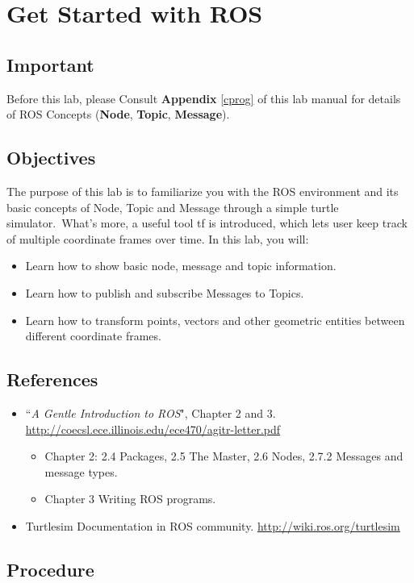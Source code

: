\chapter{Get Started with ROS}
\section{Important}
Before this lab, please Consult \textbf{Appendix} \ref{cprog} of this lab manual for details of ROS Concepts (\textbf{Node}, \textbf{Topic}, \textbf{Message}).

\section{Objectives}
The purpose of this lab is to familiarize you with the ROS environment and its basic concepts of Node, Topic and Message through a simple turtle simulator.\
What's more, a useful tool tf is introduced, which lets user keep track of multiple coordinate frames over time.
In this lab, you will:

\begin{itemize}
	\item Learn how to show basic node, message and topic information.
	\item Learn how to publish and subscribe Messages to Topics.
	\item Learn how to transform points, vectors and other geometric entities between different coordinate frames.
\end{itemize}

\section{References}
\begin{itemize}
	\item ``\textit{A Gentle Introduction to ROS}", Chapter 2 and 3. \url{http://coecsl.ece.illinois.edu/ece470/agitr-letter.pdf}
	\begin{itemize}
		\item Chapter 2: 2.4 Packages, 2.5 The Master, 2.6 Nodes, 2.7.2 Messages and message types.
		\item Chapter 3 Writing ROS programs.
	\end{itemize}
	\item Turtlesim Documentation in ROS community.
	\url{http://wiki.ros.org/turtlesim}
\end{itemize}

\section{Procedure}

